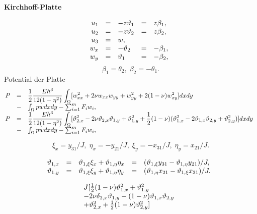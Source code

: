 \documentclass[12pt,a4paper]{article}
\begin{document}
%
\addtolength{\abovedisplayskip}{-1ex}
\addtolength{\belowdisplayskip}{-1ex}
\addtolength{\abovedisplayshortskip}{-1ex}
\addtolength{\belowdisplayshortskip}{-1ex}
%
%
\bc
{\bf Kirchhoff-Platte}
\ec
{\large
\[
\ba{.}{rclcl}
u_1 &=& - z\theta_1 &=& z\beta _1,\\
u_2 &=& - z\theta_2 &=& z\beta _2,\\
u_3 &=& w,\\
w_x &=& - \theta_2 &=& - \beta _1,\\
w_y &=& \theta_1 &=& - \beta _2,
\ea{.}
\]
\[
\beta _1 = \theta_2, \; \beta _2 = - \theta_1.
\]
Potential der Platte
\[
\ba{.}{rcl}
P &=& \dis \frac{1}{2}\frac{Eh^3}{12(1 - \eta ^2)}\int_{\Omega}
[w_{xx}^2 + 2\nu w_{xx}w_{yy} + w_{yy}^2 + 2(1 - \nu )w_{xy}^2]dxdy\\
&-& \int_{\Omega}pwdxdy - \sum_{i=1}^mF_iw_i,\\
P &=& \dis \frac{1}{2}\frac{Eh^3}{12(1 - \eta ^2)}\int_{\Omega}
[\theta_{2,x}^2 - 2\nu \theta _{2,x}\theta _{1,y} + \theta _{1,y}^2
+ \frac{1}{2}(1 - \nu )(\theta ^2_{1,x} - 2\theta _{1,x}\theta _{2,y} + \theta
_{2,y}^2)]dxdy\\
&-& \int_{\Omega}pwdxdy - \sum_{i=1}^mF_iw_i,\\
\ea{.}
\]
\par
\[
\xi _x = y_{31}/J, \; \eta _x = - y_{21}/J, \; \xi_y = - x_{31}/J, \;
\eta _y = x_{21}/J.
\]
\par
\[
\ba{.}{rclcl}
\theta _{1,x} &=& \theta _{1,\xi }\xi _x + \theta _{1,\eta }\eta _x
 &=& (\theta _{1,\xi }y_{31} - \theta _{1,\eta }y_{21})/J,\\
\theta _{1,y} &=& \theta _{1,\xi }\xi _y + \theta _{1,\eta }\eta _y
 &=& (\theta _{1,\eta }x_{21} - \theta _{1,\xi }x_{31})/J.
\ea{.}
\]
\par
\[
\ba{.}{l}
J[\frac{1}{2}(1 - \nu )\theta ^2_{1,x} + \theta ^2_{1,y}\\
 - 2\nu \delta _{2,x}\theta _{1,y} - (1 - \nu )\theta _{1,x}\theta _{2,y}\\
+ \theta ^2_{2,x} + \frac{1}{2}(1 - \nu )\theta ^2_{2,y}]\\
\ea{.}
\]

}
\end{document}
